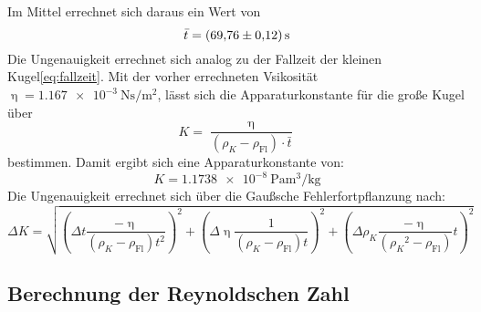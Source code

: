  Im Mittel errechnet sich daraus ein Wert von
 \begin{equation*}
   \bar{t} = \SI{69.76\pm0.12}{\second}
 \end{equation*}
 Die Ungenauigkeit errechnet sich analog zu der Fallzeit der kleinen Kugel\eqref{eq:fallzeit}.
 Mit der vorher errechneten Vsikosität $\upeta=\SI{1.167e-3}{\newton\second\per\meter\squared}$, lässt sich die Apparaturkonstante für die große Kugel über
 \begin{equation*}
   K =\frac{\upeta}{(\rho_K - \rho_\text{Fl})\cdot \bar{t}}
 \end{equation*}
 bestimmen.
 Damit ergibt sich eine Apparaturkonstante von:
 \begin{equation*}
   K=\SI{1.1738e-8}{\pascal\cubic\meter\per\kilo\gram}
 \end{equation*}
 Die Ungenauigkeit errechnet sich über die Gaußsche Fehlerfortpflanzung nach:
 \begin{equation*}
   \Delta K = \sqrt{(\Delta t \frac{- \upeta}{(\rho_K - \rho_\text{Fl})t^2})^2 +(\Delta \upeta \frac{1}{(\rho_K - \rho_\text{Fl})t})^2 + (\Delta \rho_K \frac{-\upeta}{({\rho_K}^2 - \rho_\text{Fl})}t)^2}
 \end{equation*}
\subsection{Berechnung der Reynoldschen Zahl}
